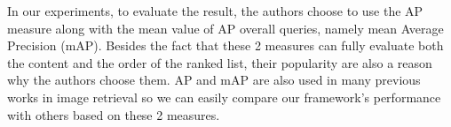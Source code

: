 In our experiments, to evaluate the result, the authors choose to use the AP measure along with the mean value of AP overall queries, namely mean Average Precision (mAP). Besides the fact that these 2 measures can fully evaluate both the content and the order of the ranked list, their popularity are also a reason why the authors choose them. AP and mAP are also used in many previous works in image retrieval so we can easily compare our framework's performance with others based on these 2 measures.
